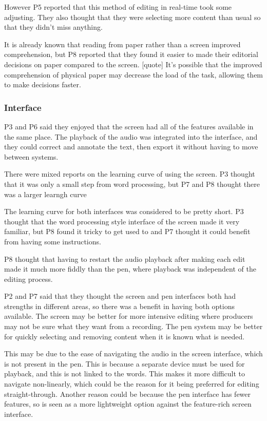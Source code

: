 However P5 reported that this method of editing in real-time took some adjusting. They also thought that they were
selecting more content than usual so that they didn't miss anything.

It is already known that reading from paper rather than a screen improved comprehension, but P8 reported that they
found it easier to made their editorial decisions on paper compared to the screen. [quote] It's possible that the
improved comprehension of physical paper may decrease the load of the task, allowing them to make decisions faster.

\subsubsection{Interface}

P3 and P6 said they enjoyed that the screen had all of the features available in the same place. The playback of the
audio was integrated into the interface, and they could correct and annotate the text, then export it without having to
move between systems.

There were mixed reports on the learning curve of using the screen. P3 thought that it was only a small step from word
processing, but P7 and P8 thought there was a larger learngh curve

The learning curve for both interfaces was considered to be pretty short. P3 thought that the word processing style
interface of the screen made it very familiar, but P8 found it tricky to get used to and P7 thought it could benefit
from having some instructions.

P8 thought that having to restart the audio playback after making each edit made it much more fiddly than the pen,
where playback was independent of the editing process.

P2 and P7 said that they thought the screen and pen interfaces both had strengths in different areas, so there was a
benefit in having both options available. The screen may be better for more intensive editing where producers may not
be sure what they want from a recording. The pen system may be better for quickly selecting and removing content when
it is known what is needed.

This may be due to the ease of navigating the audio in the screen interface, which is not present in the pen. This is
because a separate device must be used for playback, and this is not linked to the words. This makes it more difficult
to navigate non-linearly, which could be the reason for it being preferred for editing straight-through. Another reason
could be because the pen interface has fewer features, so is seen as a more lightweight option against the feature-rich
screen interface.

